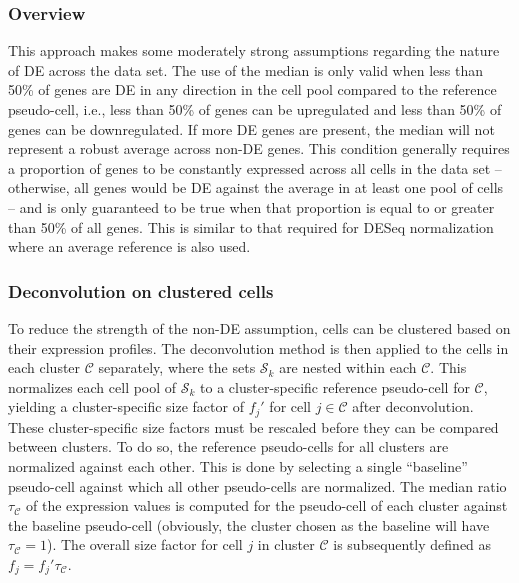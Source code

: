 \documentclass{article}
\begin{document}
\subsubsection{Overview}
This approach makes some moderately strong assumptions regarding the nature of DE across the data set.
The use of the median is only valid when less than 50\% of genes are DE in any direction in the cell pool compared to the reference pseudo-cell,
    i.e., less than 50\% of genes can be upregulated and less than 50\% of genes can be downregulated.
If more DE genes are present, the median will not represent a robust average across non-DE genes.
This condition generally requires a proportion of genes to be constantly expressed across all cells in the data set 
    -- otherwise, all genes would be DE against the average in at least one pool of cells -- 
    and is only guaranteed to be true when that proportion is equal to or greater than 50\% of all genes.
This is similar to that required for DESeq normalization where an average reference is also used.

\subsubsection{Deconvolution on clustered cells}
To reduce the strength of the non-DE assumption, cells can be clustered based on their expression profiles.
The deconvolution method is then applied to the cells in each cluster $\mathcal{C}$ separately,
    where the sets $\mathcal{S}_k$ are nested within each $\mathcal{C}$.
This normalizes each cell pool of $\mathcal{S}_k$ to a cluster-specific reference pseudo-cell for $\mathcal{C}$,
    yielding a cluster-specific size factor of $f_{j}'$ for cell $j \in \mathcal{C}$ after deconvolution.
These cluster-specific size factors must be rescaled before they can be compared between clusters.
To do so, the reference pseudo-cells for all clusters are normalized against each other.
This is done by selecting a single ``baseline'' pseudo-cell against which all other pseudo-cells are normalized.
The median ratio $\tau_{\mathcal{C}}$ of the expression values is computed for the pseudo-cell of each cluster against the baseline pseudo-cell
    (obviously, the cluster chosen as the baseline will have $\tau_{\mathcal{C}}=1$).
The overall size factor for cell $j$ in cluster $\mathcal{C}$ is subsequently defined as $f_j = f_{j}'\tau_{\mathcal{C}}$.

\end{document}
